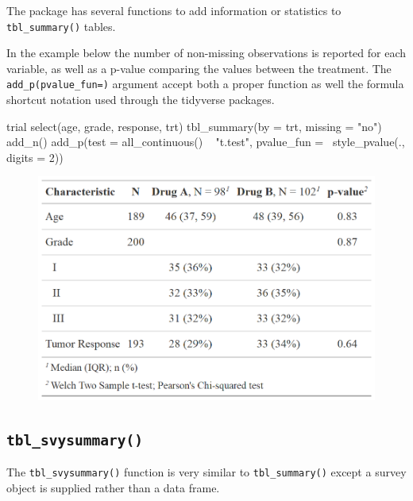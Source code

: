 The  package has several functions to add information or statistics to \texttt{tbl\_summary()} tables.



In the example below the number of non-missing observations is reported for each variable, as well as a p-value comparing the values between the treatment.
The \texttt{add\_p(pvalue\_fun=)} argument accept both a proper function as well the formula shortcut notation used through the tidyverse packages.

\begin{example}
trial %
  select(age, grade, response, trt) %
  tbl_summary(by = trt, missing = "no") %
  add_n() %
  add_p(test = all_continuous() ~ "t.test",
        pvalue_fun = ~style_pvalue(., digits = 2))

\end{example}
\begin{figure}[h!]
  \includegraphics[scale=0.28]{summary_plus_plus.png}
  \centering
\end{figure}

\subsection{\texorpdfstring{\texttt{tbl\_svysummary()}}{tbl\_svysummary()}}

The \texttt{tbl\_svysummary()} function is very similar to \texttt{tbl\_summary()} except a survey object is supplied rather than a data frame.

